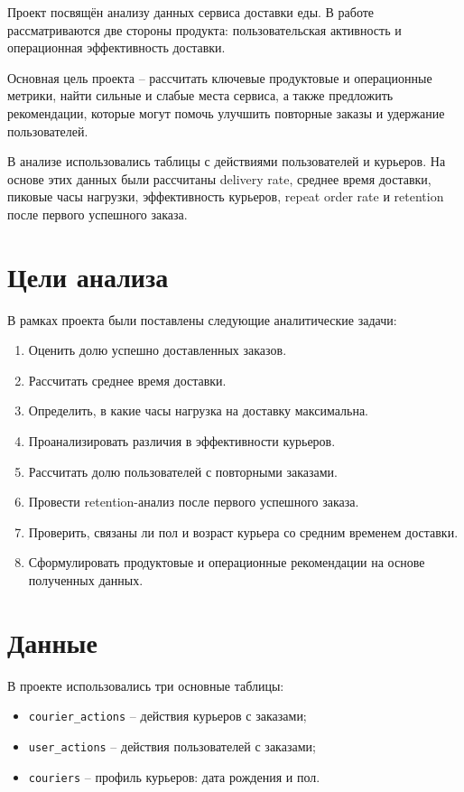 \documentclass[12pt,a4paper]{article}
\begin{document}
Проект посвящён анализу данных сервиса доставки еды. В работе рассматриваются две стороны продукта: пользовательская активность и операционная эффективность доставки.

Основная цель проекта -- рассчитать ключевые продуктовые и операционные метрики, найти сильные и слабые места сервиса, а также предложить рекомендации, которые могут помочь улучшить повторные заказы и удержание пользователей.

В анализе использовались таблицы с действиями пользователей и курьеров. На основе этих данных были рассчитаны delivery rate, среднее время доставки, пиковые часы нагрузки, эффективность курьеров, repeat order rate и retention после первого успешного заказа.

\section{Цели анализа}

В рамках проекта были поставлены следующие аналитические задачи:

\begin{enumerate}
    \item Оценить долю успешно доставленных заказов.
    \item Рассчитать среднее время доставки.
    \item Определить, в какие часы нагрузка на доставку максимальна.
    \item Проанализировать различия в эффективности курьеров.
    \item Рассчитать долю пользователей с повторными заказами.
    \item Провести retention-анализ после первого успешного заказа.
    \item Проверить, связаны ли пол и возраст курьера со средним временем доставки.
    \item Сформулировать продуктовые и операционные рекомендации на основе полученных данных.
\end{enumerate}

\newpage
\section{Данные}

В проекте использовались три основные таблицы:

\begin{itemize}
    \item \texttt{courier\_actions} -- действия курьеров с заказами;
    \item \texttt{user\_actions} -- действия пользователей с заказами;
    \item \texttt{couriers} -- профиль курьеров: дата рождения и пол.
\end{itemize}
\end{document}
